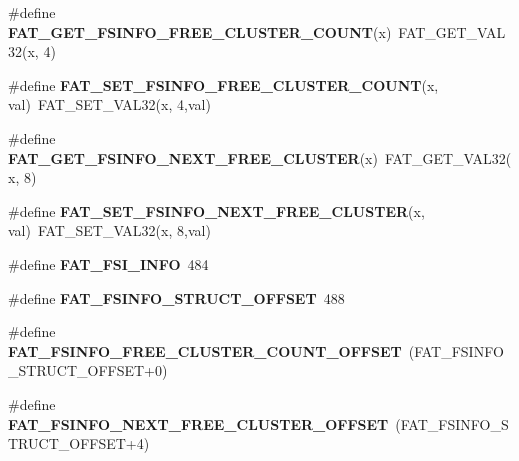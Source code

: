 \begin{DoxyCompactItemize}
\#define {\bfseries F\+A\+T\+\_\+\+G\+E\+T\+\_\+\+F\+S\+I\+N\+F\+O\+\_\+\+F\+R\+E\+E\+\_\+\+C\+L\+U\+S\+T\+E\+R\+\_\+\+C\+O\+U\+NT}(x)~F\+A\+T\+\_\+\+G\+E\+T\+\_\+\+V\+A\+L32(x, 4)
\item 
\mbox{\label{group__libfs__dosfs_gadf17dfca2b92802b91e5dc910670335c}} 
\#define {\bfseries F\+A\+T\+\_\+\+S\+E\+T\+\_\+\+F\+S\+I\+N\+F\+O\+\_\+\+F\+R\+E\+E\+\_\+\+C\+L\+U\+S\+T\+E\+R\+\_\+\+C\+O\+U\+NT}(x,  val)~F\+A\+T\+\_\+\+S\+E\+T\+\_\+\+V\+A\+L32(x, 4,val)
\item 
\mbox{\label{group__libfs__dosfs_gad551d0037a7e72b808e6e8adf8563581}} 
\#define {\bfseries F\+A\+T\+\_\+\+G\+E\+T\+\_\+\+F\+S\+I\+N\+F\+O\+\_\+\+N\+E\+X\+T\+\_\+\+F\+R\+E\+E\+\_\+\+C\+L\+U\+S\+T\+ER}(x)~F\+A\+T\+\_\+\+G\+E\+T\+\_\+\+V\+A\+L32(x, 8)
\item 
\mbox{\label{group__libfs__dosfs_ga46f45d3b82e52253e287549bdf78b798}} 
\#define {\bfseries F\+A\+T\+\_\+\+S\+E\+T\+\_\+\+F\+S\+I\+N\+F\+O\+\_\+\+N\+E\+X\+T\+\_\+\+F\+R\+E\+E\+\_\+\+C\+L\+U\+S\+T\+ER}(x,  val)~F\+A\+T\+\_\+\+S\+E\+T\+\_\+\+V\+A\+L32(x, 8,val)
\item 
\mbox{\label{group__libfs__dosfs_gac58ca27a2c127122e12c5de5b2b5db53}} 
\#define {\bfseries F\+A\+T\+\_\+\+F\+S\+I\+\_\+\+I\+N\+FO}~484
\item 
\mbox{\label{group__libfs__dosfs_ga96b884a9e4f7cfb4ca9e4ce0017b4b4f}} 
\#define {\bfseries F\+A\+T\+\_\+\+F\+S\+I\+N\+F\+O\+\_\+\+S\+T\+R\+U\+C\+T\+\_\+\+O\+F\+F\+S\+ET}~488
\item 
\mbox{\label{group__libfs__dosfs_gad2fb3adfd1250885a200cb3ab3537501}} 
\#define {\bfseries F\+A\+T\+\_\+\+F\+S\+I\+N\+F\+O\+\_\+\+F\+R\+E\+E\+\_\+\+C\+L\+U\+S\+T\+E\+R\+\_\+\+C\+O\+U\+N\+T\+\_\+\+O\+F\+F\+S\+ET}~(F\+A\+T\+\_\+\+F\+S\+I\+N\+F\+O\+\_\+\+S\+T\+R\+U\+C\+T\+\_\+\+O\+F\+F\+S\+ET+0)
\item 
\mbox{\label{group__libfs__dosfs_ga00514fbe10d98c8b4b6dadf602b3bad8}} 
\#define {\bfseries F\+A\+T\+\_\+\+F\+S\+I\+N\+F\+O\+\_\+\+N\+E\+X\+T\+\_\+\+F\+R\+E\+E\+\_\+\+C\+L\+U\+S\+T\+E\+R\+\_\+\+O\+F\+F\+S\+ET}~(F\+A\+T\+\_\+\+F\+S\+I\+N\+F\+O\+\_\+\+S\+T\+R\+U\+C\+T\+\_\+\+O\+F\+F\+S\+ET+4)

\end{DoxyCompactItemize}
